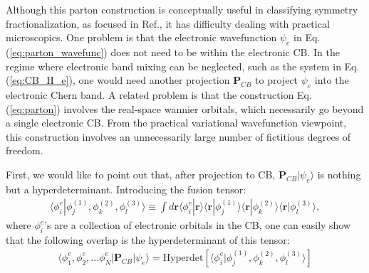Although this parton construction is conceptually useful in classifying symmetry fractionalization, as focused in Ref.\cite{lu2012symmetry}, it has difficulty dealing with practical microscopics. One problem is that the electronic wavefunction $\psi_e$ in Eq.(\ref{eq:parton_wavefunc}) does not need to be within the electronic CB. In the regime where electronic band mixing can be neglected, such as the system in Eq.(\ref{eq:CB_H_e}), one would need another projection $\mathbf P_{CB}$ to project $\psi_e$ into the electronic Chern band. A related problem is that the construction Eq.(\ref{eq:parton}) involves the real-space wannier orbitals, which necessarily go beyond a single electronic CB. From the practical variational wavefunction viewpoint, this construction involves an unnecessarily large number of fictitious degrees of freedom.

First, we would like to point out that, after projection to CB, $\mathbf P_{CB}|\psi_e\rangle$ is nothing but a hyperdeterminant. Introducing the fusion tensor:
\begin{align}
    \langle \phi^e_i| \phi^{(1)}_j, \phi^{(2)}_k , \phi^{(3)}_l\rangle\equiv \int d\bm r \langle \phi^e_{i}|\bm r\rangle \langle \bm r| \phi^{(1)}_j\rangle\langle \bm r| \phi^{(2)}_k\rangle\langle \bm r| \phi^{(3)}_l\rangle,
\end{align}
where $ \phi^e_i$'s are a collection of electronic orbitals in the CB, one can easily show that the following overlap is the hyperdeterminant of this tensor:
\begin{align}
    \langle\phi^e_{1},\phi^e_{2},...\phi^e_{N}|\mathbf P_{CB}|\psi_e\rangle=\text{Hyperdet}[\langle \phi^e_i| \phi^{(1)}_j, \phi^{(2)}_k , \phi^{(3)}_l\rangle]
\end{align}

